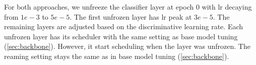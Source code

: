 For both approaches, we unfreeze the classifier layer at epoch 0 with lr decaying from $1e-3$ to $ 5e-5$.
The first unfrozen layer has lr peak at $3e-5$. The remaining layers are adjusted based on the discriminative learning rate.
Each unfrozen layer has its scheduler with the same setting as base model tuning (\autoref{sec:backbone}). However, it start scheduling when the layer was
unfrozen.
The reaming setting stays the same as in base model tuning (\autoref{sec:backbone}).
